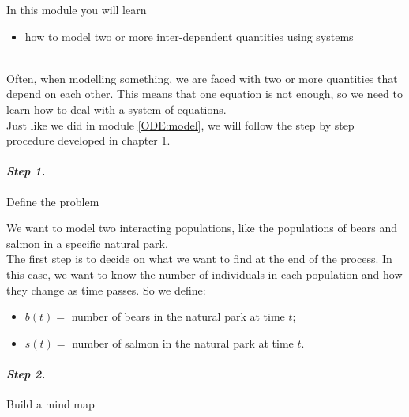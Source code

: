 In this module you will learn
\begin{itemize}
	\item how to model two or more inter-dependent quantities using systems
\end{itemize}

\hfill \\


Often, when modelling something, we are faced with two or more quantities that depend on each other. This means that one equation is not enough, so we need to learn how to deal with a system of equations. \\


Just like we did in module \ref{ODE:model}, we will follow the step by step procedure developed in chapter 1.

\paragraph{\emph{Step 1.}} Define the problem

\begin{example}
We want to model two interacting populations, like the populations of bears and salmon in a specific natural park.\\

The first step is to decide on what we want to find at the end of the process. 
In this case, we want to know the number of individuals in each population and how they change as time passes. So we define:
\begin{itemize}
	\item $b(t) =$ number of bears in the natural park at time $t$;
	\item $s(t) =$ number of salmon in the natural park at time $t$.
\end{itemize}
\end{example}


\paragraph{\emph{Step 2.}} Build a mind map

